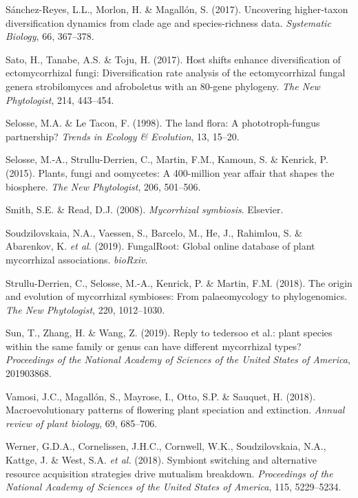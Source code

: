\documentclass[12pt,]{article}
\begin{document}
\leavevmode\hypertarget{ref-snchezreyes_2017}{}%
Sánchez-Reyes, L.L., Morlon, H. \& Magallón, S. (2017). Uncovering
higher-taxon diversification dynamics from clade age and
species-richness data. \emph{Systematic Biology}, 66, 367--378.

\leavevmode\hypertarget{ref-sato_2017}{}%
Sato, H., Tanabe, A.S. \& Toju, H. (2017). Host shifts enhance
diversification of ectomycorrhizal fungi: Diversification rate analysis
of the ectomycorrhizal fungal genera strobilomyces and afroboletus with
an 80-gene phylogeny. \emph{The New Phytologist}, 214, 443--454.

\leavevmode\hypertarget{ref-selosse_1998}{}%
Selosse, M.A. \& Le Tacon, F. (1998). The land flora: A
phototroph-fungus partnership? \emph{Trends in Ecology \& Evolution},
13, 15--20.

\leavevmode\hypertarget{ref-selosse_2015}{}%
Selosse, M.-A., Strullu-Derrien, C., Martin, F.M., Kamoun, S. \&
Kenrick, P. (2015). Plants, fungi and oomycetes: A 400-million year
affair that shapes the biosphere. \emph{The New Phytologist}, 206,
501--506.

\leavevmode\hypertarget{ref-smith_2008}{}%
Smith, S.E. \& Read, D.J. (2008). \emph{Mycorrhizal symbiosis}.
Elsevier.

\leavevmode\hypertarget{ref-soudzilovskaia_2019}{}%
Soudzilovskaia, N.A., Vaessen, S., Barcelo, M., He, J., Rahimlou, S. \&
Abarenkov, K. \emph{et al.} (2019). FungalRoot: Global online database
of plant mycorrhizal associations. \emph{bioRxiv}.

\leavevmode\hypertarget{ref-strulluderrien_2018}{}%
Strullu-Derrien, C., Selosse, M.-A., Kenrick, P. \& Martin, F.M. (2018).
The origin and evolution of mycorrhizal symbioses: From palaeomycology
to phylogenomics. \emph{The New Phytologist}, 220, 1012--1030.

\leavevmode\hypertarget{ref-sun_2019}{}%
Sun, T., Zhang, H. \& Wang, Z. (2019). Reply to tedersoo et al.: plant
species within the same family or genus can have different mycorrhizal
types? \emph{Proceedings of the National Academy of Sciences of the
United States of America}, 201903868.

\leavevmode\hypertarget{ref-vamosi_2018}{}%
Vamosi, J.C., Magallón, S., Mayrose, I., Otto, S.P. \& Sauquet, H.
(2018). Macroevolutionary patterns of flowering plant speciation and
extinction. \emph{Annual review of plant biology}, 69, 685--706.

\leavevmode\hypertarget{ref-werner_2018}{}%
Werner, G.D.A., Cornelissen, J.H.C., Cornwell, W.K., Soudzilovskaia,
N.A., Kattge, J. \& West, S.A. \emph{et al.} (2018). Symbiont switching
and alternative resource acquisition strategies drive mutualism
breakdown. \emph{Proceedings of the National Academy of Sciences of the
United States of America}, 115, 5229--5234.
\end{document}
